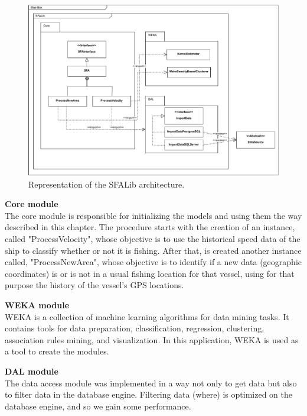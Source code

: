 \begin{figure}[]
\centering
\includegraphics[width=1.0\linewidth]{Chapters/img/SFALib_Prof.pdf}
\caption{Representation of the SFALib architecture.}
\label{fig:SFALib_Prof}
\end{figure}



\textbf{Core module} \\The core module is responsible for initializing the models and using them the way described in this chapter. The procedure starts with the creation of an instance, called  "ProcessVelocity", whose objective is to use the historical speed data of the ship to classify whether or not it is fishing. After that, is created another instance called, "ProcessNewArea", whose objective is to identify if a new data (geographic coordinates) is or is not in a usual fishing location for that vessel, using for that purpose the history of the vessel's GPS locations.

\textbf{WEKA module} \\WEKA is a collection of machine learning algorithms for data mining tasks. It contains tools for data preparation, classification, regression, clustering, association rules mining, and visualization. In this application, WEKA is used as a tool to create the modules.

\textbf{DAL module} \\The data access module was implemented in a way not only to get data but also to filter data in the database engine. Filtering data (where) is optimized on the database engine, and so we gain some performance.




